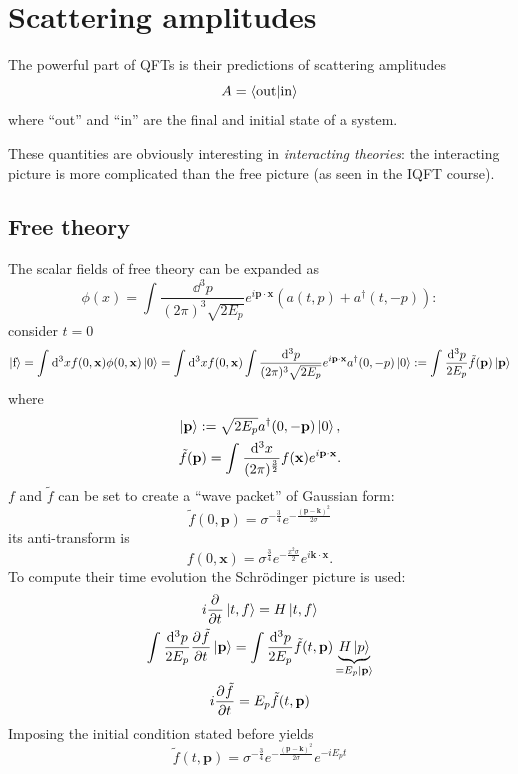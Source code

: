 
\section{Scattering amplitudes}
The powerful part of QFTs is their predictions of scattering amplitudes
\[
    A=\bra{\text{out}}\ket{\text{in}}
\]
where ``out'' and ``in'' are the final and initial state of a system.

These quantities are obviously interesting in \textit{interacting theories}:
the interacting picture is more complicated than the free picture (as seen in
the IQFT course).

\subsection{Free theory}
The scalar fields of free theory can be expanded as
\[
    \phi(x)=\int_{}^{} \frac{\dd^3p}{(2\pi)^3\sqrt{2E_p}}e^{i\mathbf{p\cdot x}}
    \left(a(t,p)+a^\dagger(t,-p)\right):
\]
consider $t=0$
\[
    \ket{\text{f}}=\int_{}^{} \dd^3x f(0,\mathbf{x})\phi(0,\mathbf{x})\ket{0}=
    \int_{}^{} \dd^3x f(0,\mathbf{x})\int\frac{\dd^3p}{(2\pi)^3\sqrt{2E_p}}e^{i
    \mathbf{p\cdot x}}a^\dagger(0,-p)\ket{0}:=\int_{}^{} \frac{\dd^3p}{2E_p}
    \tilde f(\mathbf{p})\ket{\mathbf{p}}
\]
where
\begin{gather*}
    \ket{\mathbf{p}}:=\sqrt{2E_p}a^\dagger(0,\mathbf{-p})\ket{0},\\
    \tilde f(\mathbf{p})=\int_{}^{} \frac{\dd^3x}{(2\pi)^{\frac{3}{2}}}f(
    \mathbf{x})e^{i\mathbf{p\cdot x}}.
\end{gather*}
$f$ and $\tilde f$ can be set to create a ``wave packet'' of Gaussian form:
\[
    \tilde f(0,\mathbf{p})=\sigma^{-\frac{3}{4}}e^{-\frac{(\mathbf{p-k})^2}{2
    \sigma}}
\]
its anti-transform is
\[
    f(0,\mathbf{x})=\sigma^{\frac{3}{4}}e^{-\frac{x^2\sigma}{2}}e^{i\mathbf{k\cdot
    x}}.
\]
To compute their time evolution the Schrödinger picture is used:
\begin{gather*}
    i\pdv[]{}{t}\ket{t,f} = H\ket{t,f}\\
    \int_{}^{}\frac{\dd^3p}{2E_p}\pdv[]{\tilde f}{t}\ket{\mathbf{p}} =
    \int\frac{\dd^3p}{2E_p}\tilde f(t,\mathbf{p})\underbrace{H\ket{p}}_{
    =E_p\ket{\mathbf{p}}}\\
    i\pdv[]{\tilde f}{t} = E_p\tilde f(t,\mathbf{p} )
\end{gather*}
Imposing the initial condition stated before yields
\[
    \tilde f(t,\mathbf{p})=\sigma^{-\frac{3}{4}}e^{-\frac{(\mathbf{p-k})^2}{2
    \sigma}}e^{-iE_pt}
\]
